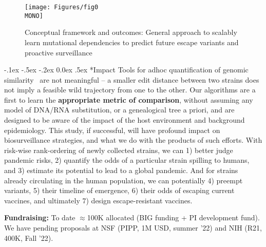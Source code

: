 \documentclass[onecolumn, compsoc,12pt]{IEEEtran}
\makeatletter
\renewcommand\paragraph{\@startsection {section}{1}{\z@}%
                                   {-.1ex \@plus -.5ex \@minus -.2ex}%
                                   {0.0ex \@plus.5ex}%
                                   {\fontsize{11}{10}\selectfont\bfseries\itshape\sffamily\color{black}}}
\renewcommand{\captionN}[1]{\caption{\color{CadetBlue4!80!black} \sffamily \fontsize{9}{10}\selectfont #1  }}
\def\hcov{SARS-CoV-2\xspace}
\def\infl{Influenza A\xspace}
\def\MONO{mono}
\makeatother
\begin{document}
\begin{wrapfigure}[17]{l}{4.7in}
\vspace{-29pt}

  \texttt{[image: Figures/fig0\\MONO]}
  
    \vspace{-18pt}

  \captionN{Conceptual framework and outcomes: General approach to scalably learn mutational  dependencies to predict future escape variants and proactive surveillance }\label{fig1}
  \vspace{5pt}
  
\end{wrapfigure}\paragraph*{Impact}  Tools for adhoc quantification of genomic similarity~\cite{posada1998modeltest,neher2014predicting} are not meaningful -- a smaller edit distance between two strains  does not imply  a feasible wild trajectory  from one to the other.  Our  algorithms are a first to learn the \textbf{appropriate metric of comparison}, without assuming any model of DNA/RNA substitution, or a genealogical tree a priori, and are  designed to be aware of the impact of the  host environment and background epidemiology. %
This study, if successful, will have profound impact on  biosurveillance strategies, and what we do with the products of such efforts. With  risk-wise rank-ordering of  newly collected strains, we can  1) better judge pandemic risks, 2) quantify the odds of a particular strain spilling to humans, and 3) estimate its potential to lead to a global pandemic. And for strains already circulating in the human population, we can potentially  4) preempt variants, 5) their timeline of emergence,  6) their odds of escaping current vaccines, and ultimately 7) design escape-resistant vaccines.

\textbf{Fundraising:} To date $\approx$100K allocated (BIG funding + PI development fund). We have pending proposals at NSF (PIPP, 1M USD, summer '22) and NIH (R21, 400K, Fall '22). 
\end{document}
